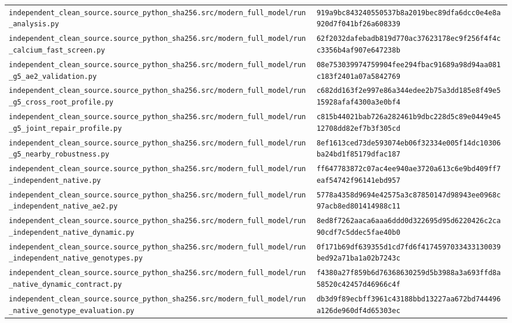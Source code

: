 \begin{longtable}{p{.46\linewidth}p{.46\linewidth}}
\nolinkurl{independent_clean_source.source_python_sha256.src/modern_full_model/run_analysis.py} & \nolinkurl{919a9bc843240550537b8a2019bec89dfa6dcc0e4e8a920d7f041bf26a608339} \\
\nolinkurl{independent_clean_source.source_python_sha256.src/modern_full_model/run_calcium_fast_screen.py} & \nolinkurl{62f2032dafebadb819d770ac37623178ec9f256f4f4cc3356b4af907e647238b} \\
\nolinkurl{independent_clean_source.source_python_sha256.src/modern_full_model/run_g5_ae2_validation.py} & \nolinkurl{08e753039974759904fee294fbac91689a98d94aa081c183f2401a07a5842769} \\
\nolinkurl{independent_clean_source.source_python_sha256.src/modern_full_model/run_g5_cross_root_profile.py} & \nolinkurl{c682dd163f2e997e86a344edee2b75a3dd185e8f49e515928afaf4300a3e0bf4} \\
\nolinkurl{independent_clean_source.source_python_sha256.src/modern_full_model/run_g5_joint_repair_profile.py} & \nolinkurl{c815b44021bab726a282461b9dbc228d5c89e0449e4512708dd82ef7b3f305cd} \\
\nolinkurl{independent_clean_source.source_python_sha256.src/modern_full_model/run_g5_nearby_robustness.py} & \nolinkurl{8ef1613ced73de593074eb06f32334e005f14dc10306ba24bd1f85179dfac187} \\
\nolinkurl{independent_clean_source.source_python_sha256.src/modern_full_model/run_independent_native.py} & \nolinkurl{ff647783872c07ac4ee940ae3720a613c6e9bd409ff7eaf54742f96141ebd957} \\
\nolinkurl{independent_clean_source.source_python_sha256.src/modern_full_model/run_independent_native_ae2.py} & \nolinkurl{5778a4358d9694e42575a3c87850147d98943ee0968c97acb8ed801414988c11} \\
\nolinkurl{independent_clean_source.source_python_sha256.src/modern_full_model/run_independent_native_dynamic.py} & \nolinkurl{8ed8f7262aaca6aaa6ddd0d322695d95d6220426c2ca90cdf7c5ddec5fae40b0} \\
\nolinkurl{independent_clean_source.source_python_sha256.src/modern_full_model/run_independent_native_genotypes.py} & \nolinkurl{0f171b69df639355d1cd7fd6f4174597033433130039bed92a71ba1a02b7243c} \\
\nolinkurl{independent_clean_source.source_python_sha256.src/modern_full_model/run_native_dynamic_contract.py} & \nolinkurl{f4380a27f859b6d76368630259d5b3988a3a693ffd8a58520c42457d46966c4f} \\
\nolinkurl{independent_clean_source.source_python_sha256.src/modern_full_model/run_native_genotype_evaluation.py} & \nolinkurl{db3d9f89ecbff3961c43188bbd13227aa672bd744496a126de960df4d65303ec} \\

\end{longtable}
